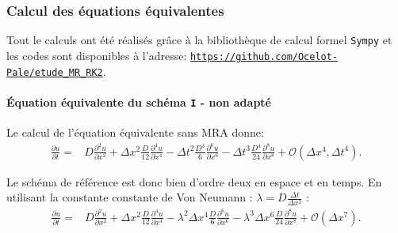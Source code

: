 \subsubsection{Calcul des équations équivalentes}
Tout le calculs ont été réalisés grâce à la bibliothèque de calcul formel \texttt{Sympy} et les codes 
sont disponibles à l'adresse: \href{https://github.com/Ocelot-Pale/etude_MR_RK2}{\nolinkurl{https://github.com/Ocelot-Pale/etude_MR_RK2}}.
\paragraph{Équation équivalente du schéma \texttt{I} - non adapté}
    Le calcul de l'équation équivalente sans MRA donne:
    \begin{align}
        \frac{\partial u}{\partial t}  =&D \frac{\partial^{2}u}{\partial x^{2}}
        + \Delta x^{2} \frac{D}{12}             \frac{\partial^{4}u}{\partial x^{4}} 
        -  \Delta t^{2} \frac{D^{3}}{6}          \frac{\partial^{6}u}{\partial x^{6}} 
        -  \Delta t^{3} \frac{D^{4}}{24}        \frac{\partial^{8}u}{\partial x^{8}}  + \mathcal{O}(\Delta x^4 , \Delta t^4).
    \end{align}
    
    Le schéma de référence est donc bien d'ordre deux en espace et en temps.
    En utilisant la constante constante de Von Neumann : $\lambda = D \frac{\Delta t}{\Delta x^2}$ : 
    \begin{align}\label{eq:ref:cfl}
        \frac{\partial u}{\partial t}  =&D \frac{\partial^{2}u}{\partial x^{2}}
        + \Delta x^{2} \frac{D}{12}             \frac{\partial^{4}u}{\partial x^{4}} 
        - \lambda^2 \Delta  x^{4} \frac{D}{6}          \frac{\partial^{6}u}{\partial x^{6}} 
        - \lambda^3 \Delta x^{6} \frac{D}{24}        \frac{\partial^{8}u}{\partial x^{8}}  + \mathcal{O}(\Delta x^7).
    \end{align}
